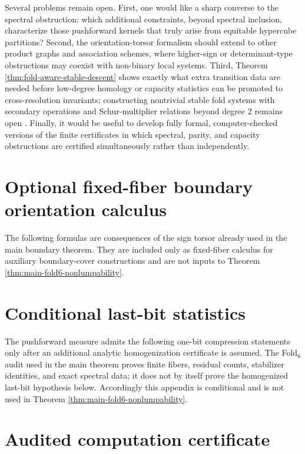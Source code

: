 \documentclass[12pt,a4paper]{article}
\theoremstyle{plain}
\theoremstyle{definition}
\numberwithin{equation}{section}
\begin{document}
Several problems remain open. First, one would like a sharp converse to the spectral obstruction: which additional constraints, beyond spectral inclusion, characterize those pushforward kernels that truly arise from equitable hypercube partitions? Second, the orientation-torsor formalism should extend to other product graphs and association schemes, where higher-sign or determinant-type obstructions may coexist with non-binary local systems. Third, Theorem \ref{thm:fold-aware-stable-descent} shows exactly what extra transition data are needed before low-degree homology or capacity statistics can be promoted to cross-resolution invariants; constructing nontrivial stable fold systems with secondary operations and Schur-multiplier relations beyond degree \(2\) remains open \cite{brown1982cohomology,nakaoka1961homology}. Finally, it would be useful to develop fully formal, computer-checked versions of the finite certificates in which spectral, parity, and capacity obstructions are certified simultaneously rather than independently.

\appendix

\section{Optional fixed-fiber boundary orientation calculus}\label{app:optional-boundary-orientation-calculus}
The following formulas are consequences of the sign torsor already used in the main boundary theorem.  They are included only as fixed-fiber calculus for auxiliary boundary-cover constructions and are not inputs to Theorem \ref{thm:main-fold6-nonlumpability}.


\section{Conditional last-bit statistics}\label{app:conditional-lastbit-statistics}

The pushforward measure admits the following one-bit compression statements only after an additional analytic homogenization certificate is assumed.  The Fold\(_6\) audit used in the main theorem proves finite fibers, residual counts, stabilizer identities, and exact spectral data; it does not by itself prove the homogenized last-bit hypothesis below.  Accordingly this appendix is conditional and is not used in Theorem \ref{thm:main-fold6-nonlumpability}.


\section{Audited computation certificate}\label{app:audited-computation-certificate}




\end{document}
